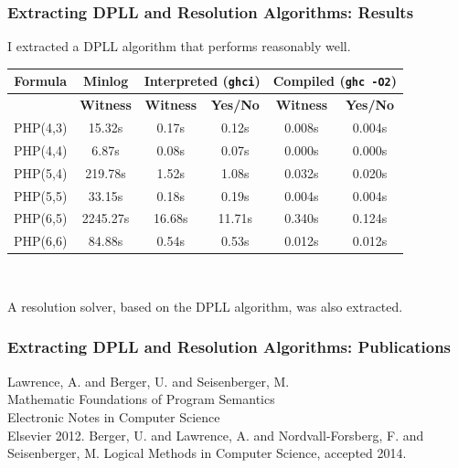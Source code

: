 \documentclass{beamer}
\begin{document}
\begin{frame}
\frametitle{Extracting DPLL and Resolution Algorithms: Results}
I extracted a DPLL algorithm that performs reasonably well.\\
\bigskip
\begin{tabular}{|c|c|c|c|c|c|}
  \hline
  \textbf{Formula}  & \textbf{Minlog} &  \multicolumn{2}{|c|}{\textbf{Interpreted (\texttt{ghci})}} & \multicolumn{2}{|c|}{\textbf{Compiled (\texttt{ghc -O2})}}  \\ \hline
  & \textbf{Witness} & \textbf{Witness} & \textbf{Yes/No} & \textbf{Witness} & \textbf{Yes/No} \\ \hline
  PHP(4,3) & 15.32s   &  0.17s   &  0.12s  &  0.008s  &  0.004s \\ \hline
  PHP(4,4) & 6.87s    &  0.08s   &  0.07s  &  0.000s  &  0.000s \\ \hline
  PHP(5,4) & 219.78s  &  1.52s   &  1.08s  &  0.032s  &  0.020s \\ \hline
  PHP(5,5) & 33.15s   &  0.18s   &  0.19s  &  0.004s  &  0.004s \\ \hline
  PHP(6,5) & 2245.27s &  16.68s  &  11.71s &  0.340s  &  0.124s \\ \hline
  PHP(6,6) & 84.88s   &  0.54s   &  0.53s  &  0.012s  &  0.012s \\ \hline
\end{tabular} \\
\bigskip

A resolution solver, based on the DPLL algorithm, was also extracted.

\end{frame}



\begin{frame}
\frametitle{Extracting DPLL and Resolution Algorithms: Publications}
 \begin{thebibliography}{10}    
  \beamertemplatearticlebibitems
{} Lawrence, A. and Berger, U. and Seisenberger, M.
 \\
Mathematic Foundations of Program Semantics \\
Electronic Notes in Computer Science \\
Elsevier 2012.
\medskip
{} Berger, U. and Lawrence, A. and Nordvall-Forsberg, F. and Seisenberger, M.
Logical Methods in Computer Science, accepted 2014.
\end{thebibliography}
\end{frame}
\end{document}
